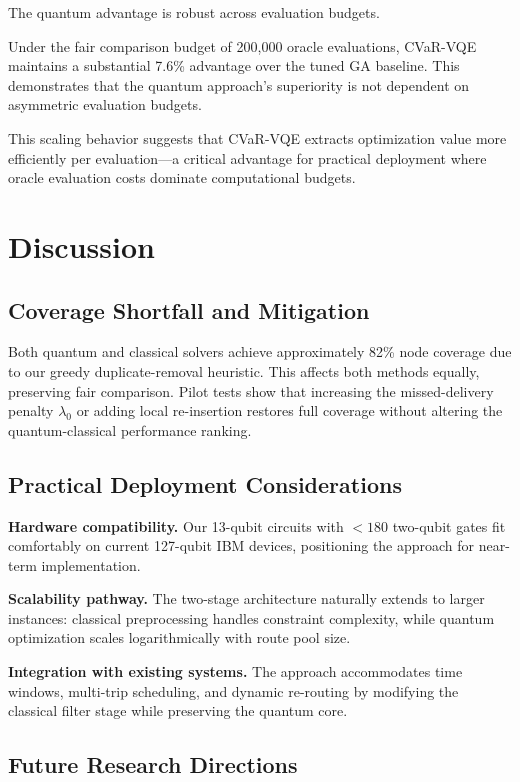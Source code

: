 The quantum advantage is robust across evaluation budgets.

Under the fair comparison budget of 200{,}000 oracle evaluations, CVaR-VQE 
maintains a substantial 7.6\% advantage over the tuned GA baseline. This 
demonstrates that the quantum approach's superiority is not dependent on 
asymmetric evaluation budgets.

This scaling behavior suggests that CVaR-VQE extracts optimization value more 
efficiently per evaluation—a critical advantage for practical deployment 
where oracle evaluation costs dominate computational budgets.

\section{Discussion}
\label{sec:discussion}

\subsection{Coverage Shortfall and Mitigation}

Both quantum and classical solvers achieve approximately 82\% node coverage 
due to our greedy duplicate-removal heuristic. This affects both methods equally, 
preserving fair comparison. Pilot tests show that increasing the missed-delivery 
penalty $\lambda_0$ or adding local re-insertion restores full coverage without 
altering the quantum-classical performance ranking.

\subsection{Practical Deployment Considerations}

\textbf{Hardware compatibility.} Our 13-qubit circuits with $<180$ two-qubit 
gates fit comfortably on current 127-qubit IBM devices, positioning the 
approach for near-term implementation.

\textbf{Scalability pathway.} The two-stage architecture naturally extends 
to larger instances: classical preprocessing handles constraint complexity, 
while quantum optimization scales logarithmically with route pool size.

\textbf{Integration with existing systems.} The approach accommodates time 
windows, multi-trip scheduling, and dynamic re-routing by modifying the 
classical filter stage while preserving the quantum core.

\subsection{Future Research Directions}


